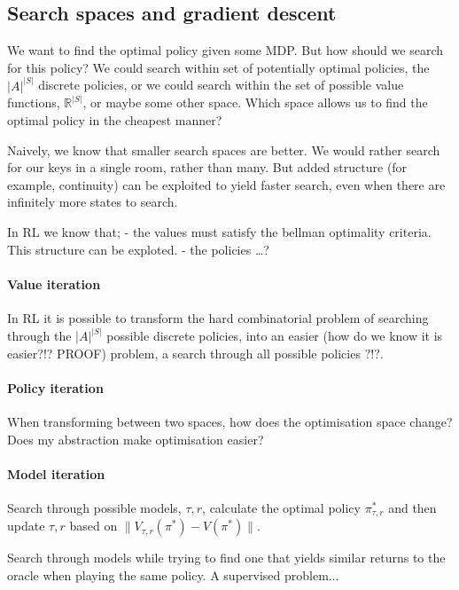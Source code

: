 \subsection{Search spaces and gradient descent}

We want to find the optimal policy given some MDP. But how should we
search for this policy? We could search within set of potentially
optimal policies, the \(|A|^{|S|}\) discrete policies, or we could
search within the set of possible value functions, \(\mathbb R^{|S|}\),
or maybe some other space. Which space allows us to find the optimal
policy in the cheapest manner?

Naively, we know that smaller search spaces are better. We would rather
search for our keys in a single room, rather than many. But added
structure (for example, continuity) can be exploited to yield faster
search, even when there are infinitely more states to search.

In RL we know that; - the values must satisfy the bellman optimality
criteria. This structure can be exploted. - the policies \ldots{}?

\paragraph{Value iteration}

In RL it is possible to transform the hard combinatorial problem of
searching through the \(|A|^{|S|}\) possible discrete policies, into an
easier (how do we know it is easier?!? PROOF) problem, a search through
all possible policies \(?!?\).


\paragraph{Policy iteration}

When transforming between two spaces, how does the optimisation space
change? Does my abstraction make optimisation easier?


\paragraph{Model iteration}

Search through possible models, \(\tau, r\), calculate the optimal
policy \(\pi^{* }_{\tau, r}\) and then update \(\tau, r\) based on
\(\parallel V_{\tau, r}(\pi^{* }) - V(\pi^{* }) \parallel\).

Search through models while trying to find one that yields similar returns to the oracle when playing the same policy.
A supervised problem...

